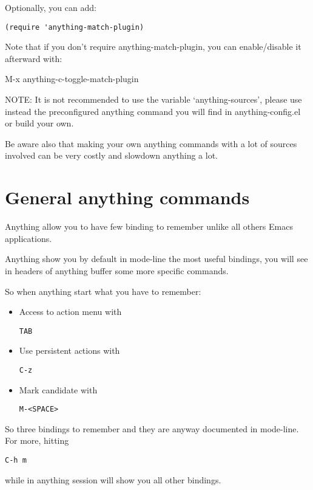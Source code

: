 \documentclass[a4paper,11pt]{article}
\begin{document}
Optionally, you can add:

\begin{verbatim}
(require 'anything-match-plugin)
\end{verbatim}

Note that if you don't require anything-match-plugin, you can enable/disable it afterward with:

M-x anything-c-toggle-match-plugin

NOTE:
It is not recommended to use the variable `anything-sources', please use instead the preconfigured anything command
you will find in anything-config.el or build your own.

Be aware also that making your own anything commands with a lot of sources involved can be very costly and slowdown
anything a lot.

\section{General anything commands}
\label{sec:gener-anyth-comm}
Anything allow you to have few binding to remember unlike all others Emacs applications.

Anything show you by default in mode-line the most useful bindings, you will see in headers of anything buffer some more specific
commands.

So when anything start what you have to remember:

\begin{itemize}
\item Access to action menu with 
\begin{verbatim}
TAB
\end{verbatim}
\end{itemize}
\begin{itemize}
\item Use persistent actions with
\begin{verbatim}
C-z
\end{verbatim}
\end{itemize}
\begin{itemize}
\item Mark candidate with
\begin{verbatim}
M-<SPACE>
\end{verbatim}
\end{itemize}

So three bindings to remember and they are anyway documented in mode-line.
For more, hitting
\begin{verbatim}
C-h m
\end{verbatim}
while in anything session will show you all other bindings.
\end{document}
